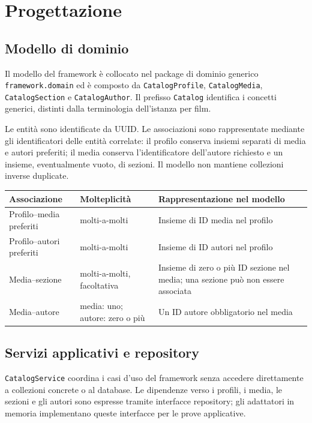 \chapter{Progettazione}

\section{Modello di dominio}
Il modello del framework è collocato nel package di dominio generico \texttt{framework.domain} ed è composto da \texttt{CatalogProfile}, \texttt{CatalogMedia}, \texttt{CatalogSection} e \texttt{CatalogAuthor}. Il prefisso \texttt{Catalog} identifica i concetti generici, distinti dalla terminologia dell'istanza per film.

Le entità sono identificate da UUID. Le associazioni sono rappresentate mediante gli identificatori delle entità correlate: il profilo conserva insiemi separati di media e autori preferiti; il media conserva l'identificatore dell'autore richiesto e un insieme, eventualmente vuoto, di sezioni. Il modello non mantiene collezioni inverse duplicate.

\begin{center}
\small
\renewcommand{\arraystretch}{1.2}
\begin{tabular}{|p{3.2cm}|p{3cm}|p{8.4cm}|}
\hline
\textbf{Associazione} & \textbf{Molteplicità} & \textbf{Rappresentazione nel modello} \\
\hline
Profilo--media preferiti & molti-a-molti & Insieme di ID media nel profilo \\
\hline
Profilo--autori preferiti & molti-a-molti & Insieme di ID autori nel profilo \\
\hline
Media--sezione & molti-a-molti, facoltativa & Insieme di zero o più ID sezione nel media; una sezione può non essere associata \\
\hline
Media--autore & media: uno; autore: zero o più & Un ID autore obbligatorio nel media \\
\hline
\end{tabular}
\end{center}

\section{Servizi applicativi e repository}
\texttt{CatalogService} coordina i casi d'uso del framework senza accedere direttamente a collezioni concrete o al database. Le dipendenze verso i profili, i media, le sezioni e gli autori sono espresse tramite interfacce repository; gli adattatori in memoria implementano queste interfacce per le prove applicative.

